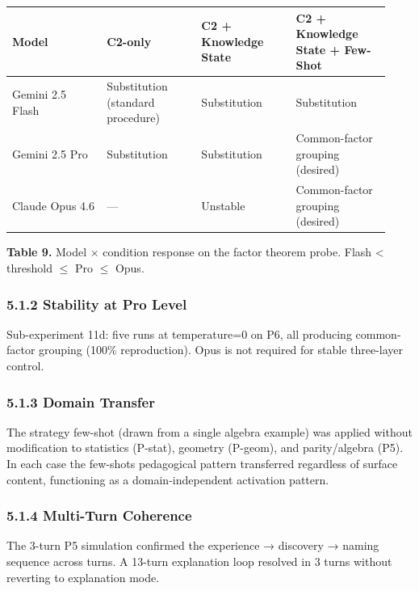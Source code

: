 \documentclass[
]{article}
\newcounter{none} %
\begin{document}
{\def\LTcaptype{none} %
\begin{longtable}[]{@{}>{\raggedright\arraybackslash}p{0.233\linewidth}>{\raggedright\arraybackslash}p{0.233\linewidth}>{\raggedright\arraybackslash}p{0.233\linewidth}>{\raggedright\arraybackslash}p{0.233\linewidth}@{}}
\toprule\noalign{}
Model & C2-only & C2 + Knowledge State & C2 + Knowledge State + Few-Shot \\
\midrule\noalign{}
\endhead
\bottomrule\noalign{}
\endlastfoot
Gemini 2.5 Flash & Substitution (standard procedure) & Substitution & Substitution \\
Gemini 2.5 Pro & Substitution & Substitution & Common-factor grouping (desired) \\
Claude Opus 4.6 & --- & Unstable & Common-factor grouping (desired) \\
\end{longtable}
}

\textbf{Table 9.} Model × condition response on the factor theorem probe. Flash \textless{} threshold $\leq$ Pro $\leq$ Opus.

\subsubsection{5.1.2 Stability at Pro Level}\label{512-stability-at-pro-level}

Sub-experiment 11d: five runs at temperature=0 on P6, all producing common-factor grouping (100\% reproduction). Opus is not required for stable three-layer control.

\subsubsection{5.1.3 Domain Transfer}\label{513-domain-transfer}

The strategy few-shot (drawn from a single algebra example) was applied without modification to statistics (P-stat), geometry (P-geom), and parity/algebra (P5). In each case the few-shot\textquotesingle s pedagogical pattern transferred regardless of surface content, functioning as a domain-independent activation pattern.

\subsubsection{5.1.4 Multi-Turn Coherence}\label{514-multi-turn-coherence}

The 3-turn P5 simulation confirmed the experience → discovery → naming sequence across turns. A 13-turn explanation loop resolved in 3 turns without reverting to explanation mode.
\end{document}

